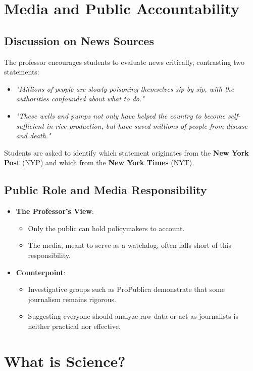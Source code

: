 \documentclass[12pt]{article}
\begin{document}
\section*{Media and Public Accountability}
\subsection*{Discussion on News Sources}
The professor encourages students to evaluate news critically, contrasting two statements:
\begin{itemize}
    \item \textit{"Millions of people are slowly poisoning themselves sip by sip, with the authorities confounded about what to do."}
    \item \textit{"These wells and pumps not only have helped the country to become self-sufficient in rice production, but have saved millions of people from disease and death."}
\end{itemize}
Students are asked to identify which statement originates from the \textbf{New York Post} (NYP) and which from the \textbf{New York Times} (NYT).

\subsection*{Public Role and Media Responsibility}
\begin{itemize}
    \item \textbf{The Professor’s View}:
    \begin{itemize}
        \item Only the public can hold policymakers to account.
        \item The media, meant to serve as a watchdog, often falls short of this responsibility.
    \end{itemize}
    \item \textbf{Counterpoint}:
    \begin{itemize}
        \item Investigative groups such as ProPublica demonstrate that some journalism remains rigorous.
        \item Suggesting everyone should analyze raw data or act as journalists is neither practical nor effective.
    \end{itemize}
\end{itemize}

\section*{What is Science?}
\end{document}
